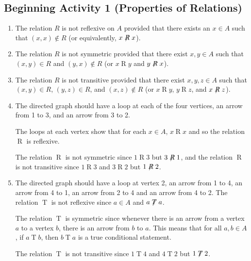 \documentclass[11pt]{article}
\begin{document}
\subsection*{Beginning Activity 1 (Properties of Relations)}
\begin{enumerate}
\item The relation  $R$  is not reflexive on  $A$  provided that there exists an  $x \in A$  such that  $\left( {x, x} \right) \notin R$ (or equivalently,  $x \not \mathrel{R} x$).

\item The relation  $R$ is not symmetric provided that there exist  $x, y \in A$ such that  
$\left( {x, y} \right) \in R$ and  $\left( {y, x} \right) \notin R$ (or  $x \mathrel{R} y$
 and  $y \not \mathrel{R} x$).

\item The relation  $R$ is not transitive provided that there exist  $x, y, z \in A$ such that  $\left( {x, y} \right) \in R$, $\left( {y, z} \right) \in R$, and  
$\left( {x, z} \right) \notin R$ (or  $x \mathrel{R} y$, $y \mathrel{R} z$, and  
$x \not \mathrel{R} z$).

\item The directed graph should have a loop at each of the four vertices, an arrow from 1 to 3, and an arrow from 3 to 2.  

The loops at each vertex show that for each $x \in A$, $x \mathrel{R} x$ and so the relation $\mathrel{R}$ is reflexive.

The relation $\mathrel{R}$ is not symmetric since $1 \mathrel{R} 3$ but $3 \not \mathrel{R} 1$, and the relation $\mathrel{R}$ is not transitive since $1 \mathrel{R} 3$ and $3 \mathrel{R} 2$ but $1 \not \mathrel{R} 2$.

\item The directed graph should have a loop at vertex 2, an arrow from 1 to 4, an arrow from 4 to 1, an arrow from 2 to 4 and  an arrow from 4 to 2.
The relation $\mathrel{T}$ is not reflexive since $a \in A$ and  $a \not \mathrel{T} a$. 

The relation $\mathrel{T}$ is symmetric since whenever there is an arrow from a vertex $a$ to a vertex $b$, there is an arrow from $b$ to $a$.  This means that for all $a, b \in A$, if $a \mathrel{T} b$, then $b \mathrel{T} a$ is a true conditional statement.

The relation $\mathrel{T}$ is not transitive since $1 \mathrel{T} 4$ and $4 \mathrel{T} 2$ but $1 \not \mathrel{T} 2$.
\end{enumerate}
\end{document}
